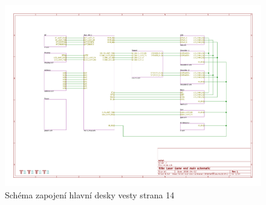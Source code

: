 \begin{landscape}
    \begin{figure}[h]
        \centering
        \includegraphics[page=14, height=\textwidth]{sch/main}
        \caption{Schéma zapojení hlavní desky vesty strana 14}
    \end{figure}
\end{landscape}


